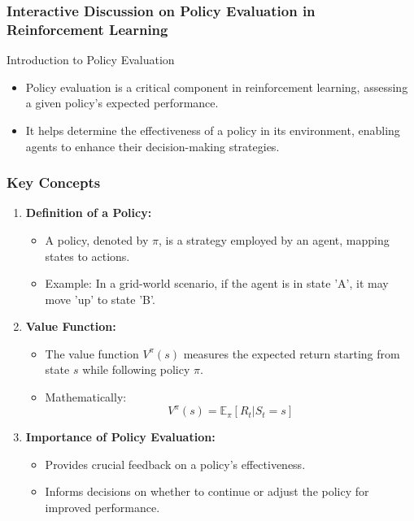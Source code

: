 \documentclass[aspectratio=169]{beamer}
\begin{document}
\begin{frame}[fragile]
    \frametitle{Interactive Discussion on Policy Evaluation in Reinforcement Learning}
    \begin{block}{Introduction to Policy Evaluation}
        \begin{itemize}
            \item Policy evaluation is a critical component in reinforcement learning, assessing a given policy's expected performance.
            \item It helps determine the effectiveness of a policy in its environment, enabling agents to enhance their decision-making strategies.
        \end{itemize}
    \end{block}
\end{frame}

\begin{frame}[fragile]
    \frametitle{Key Concepts}
    \begin{enumerate}
        \item \textbf{Definition of a Policy:}
            \begin{itemize}
                \item A policy, denoted by \( \pi \), is a strategy employed by an agent, mapping states to actions.
                \item Example: In a grid-world scenario, if the agent is in state 'A', it may move 'up' to state 'B'.
            \end{itemize}

        \item \textbf{Value Function:}
            \begin{itemize}
                \item The value function \( V^\pi(s) \) measures the expected return starting from state \( s \) while following policy \( \pi \).
                \item Mathematically:
                \[
                V^\pi(s) = \mathbb{E}_\pi \left[ R_t | S_t = s \right]
                \]
            \end{itemize}

        \item \textbf{Importance of Policy Evaluation:}
            \begin{itemize}
                \item Provides crucial feedback on a policy's effectiveness.
                \item Informs decisions on whether to continue or adjust the policy for improved performance.
            \end{itemize}
    \end{enumerate}
\end{frame}
\end{document}
